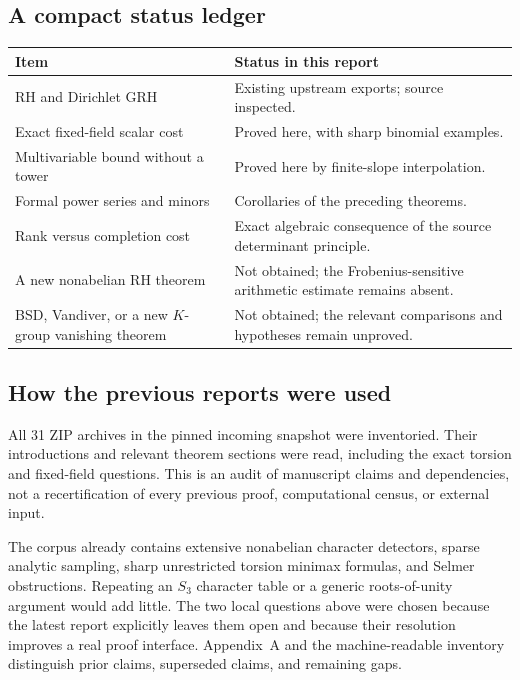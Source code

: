 \subsection{A compact status ledger}
\begin{center}
\begin{tabular}{@{}>{\raggedright\arraybackslash}p{.29\linewidth}>{\raggedright\arraybackslash}p{.62\linewidth}@{}}
\toprule
Item & Status in this report\\
\midrule
RH and Dirichlet GRH & Existing upstream exports; source inspected.\\
Exact fixed-field scalar cost & Proved here, with sharp binomial examples.\\
Multivariable bound without a tower & Proved here by finite-slope interpolation.\\
Formal power series and minors & Corollaries of the preceding theorems.\\
Rank versus completion cost & Exact algebraic consequence of the source determinant principle.\\
A new nonabelian RH theorem & Not obtained; the Frobenius-sensitive arithmetic estimate remains absent.\\
BSD, Vandiver, or a new $K$-group vanishing theorem & Not obtained; the relevant comparisons and hypotheses remain unproved.\\
\bottomrule
\end{tabular}
\end{center}

\subsection{How the previous reports were used}
All 31 ZIP archives in the pinned incoming snapshot were inventoried. Their introductions and relevant theorem sections were read, including the exact torsion and fixed-field questions. This is an audit of manuscript claims and dependencies, not a recertification of every previous proof, computational census, or external input.

The corpus already contains extensive nonabelian character detectors, sparse analytic sampling, sharp unrestricted torsion minimax formulas, and Selmer obstructions. Repeating an $S_3$ character table or a generic roots-of-unity argument would add little. The two local questions above were chosen because the latest report explicitly leaves them open and because their resolution improves a real proof interface. Appendix~A and the machine-readable inventory distinguish prior claims, superseded claims, and remaining gaps.

